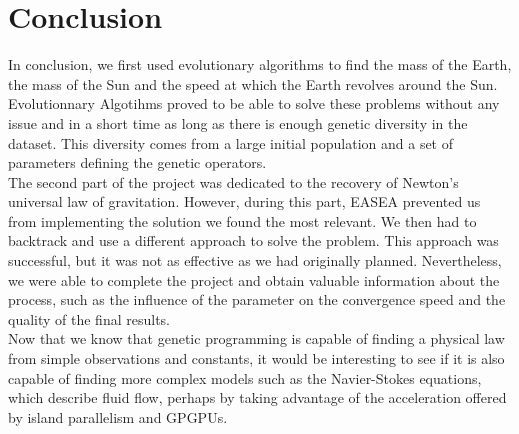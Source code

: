 \section{Conclusion}

In conclusion, we first used evolutionary algorithms to find the mass of the
Earth, the mass of the Sun and the speed at which the Earth revolves around the
Sun. Evolutionnary Algotihms proved to be able to solve these problems without
any issue and in a short time as long as there is enough genetic diversity in
the dataset. This diversity comes from a large initial population and a
set of parameters defining the genetic operators.\\

The second part of the project was dedicated to the recovery of Newton's
universal law of gravitation. However, during this part, EASEA prevented us
from implementing the solution we found the most relevant. We then had to
backtrack and use a
different approach to solve the problem. This approach was successful, but it
was not as effective as we had originally planned. Nevertheless, we were able
to complete the project and obtain valuable information about the process, such
as the influence of the parameter on the convergence speed and the quality of
the final results.\\

Now that we know that genetic programming is capable of finding a physical law
from simple observations and constants, it would be interesting to see if it is
also capable of finding more complex models such as the Navier-Stokes equations,
which describe fluid flow, perhaps by taking advantage of the acceleration
offered by island parallelism and GPGPUs.\\
